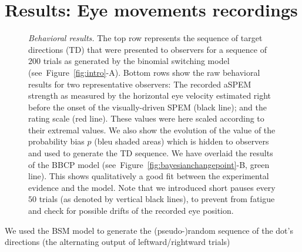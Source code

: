 \documentclass[12pt,english]{article}%
\newcommand{\seeFig}[1]{Figure~\ref{fig:#1}}
\begin{document}
\section{Results: Eye movements recordings}
\label{sec:results_psycho}
\begin{figure}%
\caption{
\emph{Behavioral results.} %
The top row represents the sequence of target directions (TD)
that were presented to observers
for a sequence of $200$ trials
as generated by the binomial switching model (see~\seeFig{intro}-A).
Bottom rows show the raw behavioral results 
for two representative observers:
The recorded aSPEM strength as measured 
by the horizontal eye velocity estimated right before
the onset of the visually-driven SPEM (black line);
and the rating scale (red line).
These values were here scaled according to their extremal values.
We also show the evolution of the value 
of the probability bias $p$ (bleu shaded areas)
which is hidden to observers
and used to generate the TD sequence.
We have overlaid the results of the BBCP model 
(see~\seeFig{bayesianchangepoint}-B, green line).
This shows qualitatively a good fit between 
the experimental evidence and the model. 
Note that we introduced short pauses 
every $50$ trials (as denoted by vertical black lines), 
to prevent from fatigue and check for possible drifts of the recorded eye position.
}
\label{fig:results_psycho}
\end{figure}
We used the BSM model
to generate the (pseudo-)random sequence of
the dot's directions (the alternating output of leftward/rightward trials)
\end{document}
